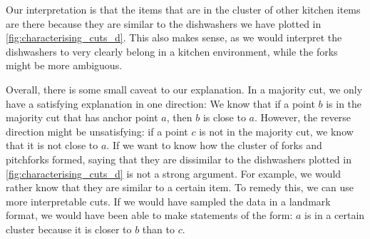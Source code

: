 Our interpretation is that the items that are in the cluster of other kitchen items are there because they are similar to
the dishwashers we have plotted in \autoref{fig:characterising_cuts_d}. This also makes sense, as we would interpret the dishwashers to very clearly belong in a kitchen environment, while the forks might be more ambiguous.

Overall, there is some small caveat to our explanation. In a majority cut, we only have a satisfying explanation in one direction: We know that if a point $b$ is in the majority cut that has anchor point $a$, 
then $b$ is close to $a$. However, the reverse direction might be unsatisfying: if a point $c$ is not in the majority cut, we know that it is not close to $a$. 
If we want to know how the cluster of forks and pitchforks formed, saying that they are dissimilar to the dishwashers plotted in \autoref{fig:characterising_cuts_d} is not a strong argument.
For example, we would rather know that they are similar to a certain item.  To remedy this, we can use more interpretable cuts. 
If we would have sampled the data in a landmark format, we would have been able to make statements of the form: $a$ is in a certain cluster because it is closer to $b$ than to $c$.


